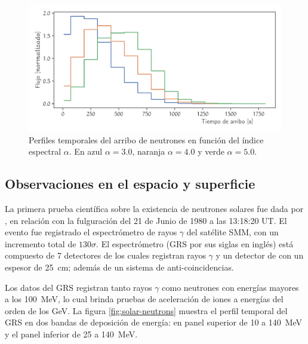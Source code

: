 \begin{figure}
        \centering
        \includegraphics[width=\textwidth]{neutron-time.pdf}
        \caption{Perfiles temporales del arribo de neutrones en función del índice espectral $\alpha$. En azul $\alpha=3.0$, naranja $\alpha=4.0$ y verde $\alpha=5.0$.}
        \label{fig:neutron-time}
\end{figure}

\subsection{Observaciones en el espacio y superficie}

La primera prueba científica sobre la existencia de neutrones solares fue dada por \cite{chupp82}, en relación con la fulguración del \num{21} de Junio de \num{1980} a las 13:18:20 UT. El evento fue registrado el espectrómetro de rayos $\gamma$ del satélite SMM, con un incremento total de $130\sigma$. El espectrómetro (GRS por sus siglas en inglés) está compuesto de \num{7} detectores de  los cuales registran rayos $\gamma$ y un detector de  con un espesor de \SI{25}{\centi\metre}; además de un sistema de anti-coincidencias.

Los datos del GRS registran tanto rayos $\gamma$ como neutrones con energías mayores a los \SI{100}{\mega\electronvolt}, lo cual brinda pruebas de aceleración de iones a energías del orden de los \si{\giga\electronvolt}. La figura \ref{fig:solar-neutrons} muestra el perfil temporal del GRS en dos bandas de deposición de energía: en panel superior de \num{10} a \SI{140}{\mega\electronvolt} y el panel inferior de \num{25} a \SI{140}{\mega\electronvolt}.

